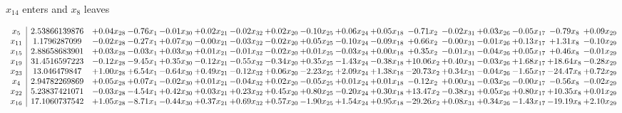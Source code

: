 \documentclass[9pt]{article}
\begin{document}
 $ x_{14} $ enters and $ x_{8} $ leaves 

 \[\begin{array}{c| c c@{\hskip 2pt} c@{\hskip 2pt} c@{\hskip 2pt} c@{\hskip 2pt} c@{\hskip 2pt} c@{\hskip 2pt} c@{\hskip 2pt} c@{\hskip 2pt} c@{\hskip 2pt} c@{\hskip 2pt} c@{\hskip 2pt} c@{\hskip 2pt} c@{\hskip 2pt} c@{\hskip 2pt} c@{\hskip 2pt} }
 x_{5}   &  2.53866139876 & +  0.04 x_{28} & -0.76 x_{1} & -0.01 x_{30} & +  0.02 x_{21} & -0.02 x_{32} & +  0.02 x_{20} & -0.10 x_{25} & +  0.06 x_{24} & +  0.05 x_{18} & -0.71 x_{2} & -0.02 x_{31} & +  0.03 x_{26} & -0.05 x_{17} & -0.79 x_{8} & +  0.09 x_{29}\\
 x_{11}   &  1.1796287099 & -0.02 x_{28} & -0.27 x_{1} & +  0.07 x_{30} & -0.00 x_{21} & -0.03 x_{32} & -0.02 x_{20} & +  0.05 x_{25} & -0.10 x_{24} & -0.09 x_{18} & +  0.66 x_{2} & -0.00 x_{31} & -0.01 x_{26} & +  0.13 x_{17} & +  1.31 x_{8} & -0.10 x_{29}\\
 x_{15}   &  2.88658683901 & +  0.03 x_{28} & -0.03 x_{1} & +  0.03 x_{30} & +  0.01 x_{21} & -0.01 x_{32} & -0.02 x_{20} & +  0.01 x_{25} & -0.03 x_{24} & +  0.00 x_{18} & +  0.35 x_{2} & -0.01 x_{31} & -0.04 x_{26} & +  0.05 x_{17} & +  0.46 x_{8} & -0.01 x_{29}\\
 x_{19}   &  31.4516597223 & -0.12 x_{28} & -9.45 x_{1} & +  0.35 x_{30} & -0.12 x_{21} & -0.55 x_{32} & -0.34 x_{20} & +  0.35 x_{25} & -1.43 x_{24} & -0.38 x_{18} & + 10.06 x_{2} & +  0.40 x_{31} & -0.03 x_{26} & +  1.68 x_{17} & + 18.64 x_{8} & -0.28 x_{29}\\
 x_{23}   &  13.046479847 & +  1.00 x_{28} & +  6.54 x_{1} & -0.64 x_{30} & +  0.49 x_{21} & -0.12 x_{32} & +  0.06 x_{20} & -2.23 x_{25} & +  2.09 x_{24} & +  1.38 x_{18} & -20.73 x_{2} & +  0.34 x_{31} & -0.04 x_{26} & -1.65 x_{17} & -24.47 x_{8} & +  0.72 x_{29}\\
 x_{4}   &  2.94782269869 & +  0.05 x_{28} & +  0.07 x_{1} & -0.02 x_{30} & +  0.01 x_{21} & -0.04 x_{32} & +  0.02 x_{20} & -0.05 x_{25} & +  0.01 x_{24} & +  0.01 x_{18} & -0.12 x_{2} & +  0.00 x_{31} & -0.03 x_{26} & -0.00 x_{17} & -0.56 x_{8} & -0.02 x_{29}\\
 x_{22}   &  5.23837421071 & -0.03 x_{28} & -4.54 x_{1} & +  0.42 x_{30} & +  0.03 x_{21} & +  0.23 x_{32} & +  0.45 x_{20} & +  0.80 x_{25} & -0.20 x_{24} & +  0.30 x_{18} & + 13.47 x_{2} & -0.38 x_{31} & +  0.05 x_{26} & +  0.80 x_{17} & + 10.35 x_{8} & +  0.01 x_{29}\\
 x_{16}   &  17.1060737542 & +  1.05 x_{28} & -8.71 x_{1} & -0.44 x_{30} & +  0.37 x_{21} & +  0.69 x_{32} & +  0.57 x_{20} & -1.90 x_{25} & +  1.54 x_{24} & +  0.95 x_{18} & -29.26 x_{2} & +  0.08 x_{31} & +  0.34 x_{26} & -1.43 x_{17} & -19.19 x_{8} & +  2.10 x_{29}\\

\end{array}\]
\end{document}
